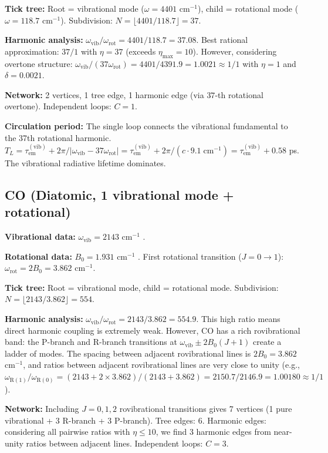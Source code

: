 \documentclass[11pt,twocolumn,a4paper]{article}
\theoremstyle{definition}
\theoremstyle{remark}
\newcommand{\tem}{\tau_{\mathrm{em}}}
\newcommand{\etamax}{\eta_{\mathrm{max}}}
\begin{document}
\textbf{Tick tree:} Root = vibrational mode ($\omega = 4401$ cm$^{-1}$), child = rotational mode ($\omega = 118.7$ cm$^{-1}$). Subdivision: $N = \lfloor 4401/118.7 \rfloor = 37$.

\textbf{Harmonic analysis:} $\omega_{\mathrm{vib}}/\omega_{\mathrm{rot}} = 4401/118.7 = 37.08$. Best rational approximation: $37/1$ with $\eta = 37$ (exceeds $\etamax = 10$). However, considering overtone structure: $\omega_{\mathrm{vib}}/(37 \omega_{\mathrm{rot}}) = 4401/4391.9 = 1.0021 \approx 1/1$ with $\eta = 1$ and $\delta = 0.0021$.

\textbf{Network:} 2 vertices, 1 tree edge, 1 harmonic edge (via $37$-th rotational overtone). Independent loops: $C = 1$.

\textbf{Circulation period:} The single loop connects the vibrational fundamental to the 37th rotational harmonic. $T_L = \tem^{(\mathrm{vib})} + 2\pi/|\omega_{\mathrm{vib}} - 37\omega_{\mathrm{rot}}| = \tem^{(\mathrm{vib})} + 2\pi/(c \cdot 9.1 \;\text{cm}^{-1}) = \tem^{(\mathrm{vib})} + 0.58$ ps. The vibrational radiative lifetime dominates.

\subsection{CO (Diatomic, 1 vibrational mode + rotational)}

\textbf{Vibrational data:} $\omega_{\mathrm{vib}} = 2143$ cm$^{-1}$ \citep{huber1979}.

\textbf{Rotational data:} $B_0 = 1.931$ cm$^{-1}$ \citep{huber1979}. First rotational transition ($J = 0 \to 1$): $\omega_{\mathrm{rot}} = 2B_0 = 3.862$ cm$^{-1}$.

\textbf{Tick tree:} Root = vibrational mode, child = rotational mode. Subdivision: $N = \lfloor 2143/3.862 \rfloor = 554$.

\textbf{Harmonic analysis:} $\omega_{\mathrm{vib}}/\omega_{\mathrm{rot}} = 2143/3.862 = 554.9$. This high ratio means direct harmonic coupling is extremely weak. However, CO has a rich rovibrational band: the P-branch and R-branch transitions at $\omega_{\mathrm{vib}} \pm 2B_0(J+1)$ create a ladder of modes. The spacing between adjacent rovibrational lines is $2B_0 = 3.862$ cm$^{-1}$, and ratios between adjacent rovibrational lines are very close to unity (e.g., $\omega_{\mathrm{R}(1)}/\omega_{\mathrm{R}(0)} = (2143 + 2 \times 3.862)/(2143 + 3.862) = 2150.7/2146.9 = 1.00180 \approx 1/1$).

\textbf{Network:} Including $J = 0, 1, 2$ rovibrational transitions gives 7 vertices (1 pure vibrational + 3 R-branch + 3 P-branch). Tree edges: 6. Harmonic edges: considering all pairwise ratios with $\eta \leq 10$, we find 3 harmonic edges from near-unity ratios between adjacent lines. Independent loops: $C = 3$.
\end{document}
